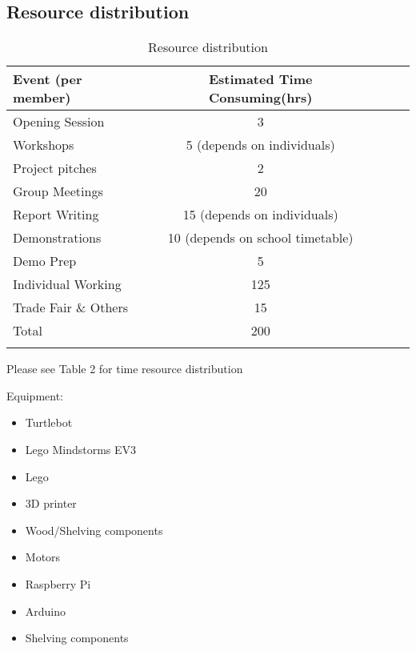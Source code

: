 \documentclass{article}
\begin{document}


\subsection{Resource distribution}
\begin{table*}[h]
\vskip 3mm
\begin{center}
\begin{small}
\begin{sc}
\begin{tabular}{lcccr}
\hline
\abovespace\belowspace
Event (per member) & Estimated Time Consuming(hrs) \\ \hline
\hline
\abovespace
Opening Session & 3 \\ \hline
Workshops & 5 (depends on individuals) \\ \hline
Project pitches & 2 \\ \hline
Group Meetings & 20  \\ \hline
Report Writing & 15 (depends on individuals) \\ \hline
Demonstrations & 10 (depends on school timetable) \\ \hline
Demo Prep & 5 \\ \hline
Individual Working  & 125 \\ \hline
Trade Fair \& Others & 15 \\ \hline
Total & 200 \\ \hline
\belowspace
\end{tabular}
\end{sc}
\end{small}
\caption{Resource distribution}
\label{tab:sample-table}
\end{center}
\vskip -3mm
\end{table*}

Please see Table 2 for time resource distribution

Equipment: 
\begin{itemize}
\item Turtlebot
\item Lego Mindstorms EV3
\item Lego
\item 3D printer
\item Wood/Shelving components 
\item Motors
\item Raspberry Pi
\item Arduino
\item Shelving components
\end{itemize}
\end{document}
